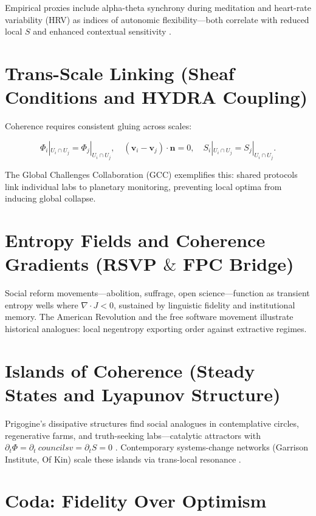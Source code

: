 \documentclass[12pt,a4paper]{article}
\begin{document}
Empirical proxies include alpha-theta synchrony during meditation and heart-rate variability (HRV) as indices of autonomic flexibility—both correlate with reduced local $S$ and enhanced contextual sensitivity \cite{varela1991embodied}.

\section{Trans-Scale Linking \quad (Sheaf Conditions and HYDRA Coupling)}

Coherence requires consistent gluing across scales:

\begin{equation}
\Phi_i|_{U_i\cap U_j} = \Phi_j|_{U_i\cap U_j}, \quad (\bm{v}_i - \bm{v}_j)\!\cdot\!\bm{n} = 0, \quad S_i|_{U_i\cap U_j} = S_j|_{U_i\cap U_j}.
\end{equation}

The Global Challenges Collaboration (GCC) exemplifies this: shared protocols link individual labs to planetary monitoring, preventing local optima from inducing global collapse.

\section{Entropy Fields and Coherence Gradients \quad (RSVP $\&$ FPC Bridge)}

Social reform movements—abolition, suffrage, open science—function as transient entropy wells where $\nabla\!\cdot\!J < 0$, sustained by linguistic fidelity and institutional memory. The American Revolution and the free software movement illustrate historical analogues: local negentropy exporting order against extractive regimes.

\section{Islands of Coherence \quad (Steady States and Lyapunov Structure)}

Prigogine’s dissipative structures find social analogues in contemplative circles, regenerative farms, and truth-seeking labs—catalytic attractors with $\partial_t \Phi = \partial_t \ councils v = \partial_t S = 0$ \cite{prigogine1984order}. Contemporary systems-change networks (Garrison Institute, Of Kin) scale these islands via trans-local resonance \cite{mcdougall2022islands}.

\section*{Coda: Fidelity Over Optimism}
\end{document}
